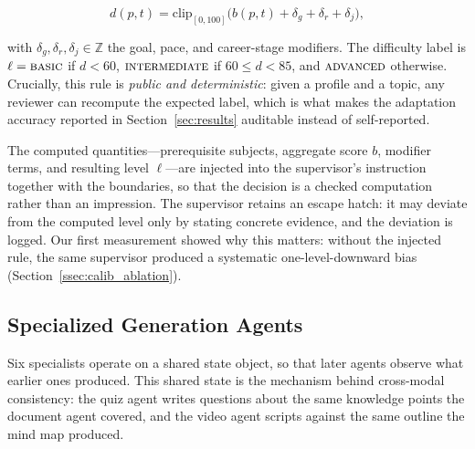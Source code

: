 \begin{equation}
d(p,t) = \mathrm{clip}_{[0,100]}\bigl(b(p,t) + \delta_g + \delta_r + \delta_j\bigr),
\end{equation}

with $\delta_g, \delta_r, \delta_j \in \mathbb{Z}$ the goal, pace, and
career-stage modifiers. The difficulty label is
$\ell = \textsc{basic}$ if $d < 60$, $\textsc{intermediate}$ if $60 \le d < 85$,
and $\textsc{advanced}$ otherwise. Crucially, this rule is \emph{public and
deterministic}: given a profile and a topic, any reviewer can recompute the
expected label, which is what makes the adaptation accuracy reported in
Section~\ref{sec:results} auditable instead of self-reported.

The computed quantities---prerequisite subjects, aggregate score $b$, modifier
terms, and resulting level $\ell$---are injected into the supervisor's
instruction together with the boundaries, so that the decision is a checked
computation rather than an impression. The supervisor retains an escape hatch:
it may deviate from the computed level only by stating concrete evidence, and
the deviation is logged. Our first measurement showed why this matters: without
the injected rule, the same supervisor produced a systematic one-level-downward
bias (Section~\ref{ssec:calib_ablation}).

\subsection{Specialized Generation Agents}

Six specialists operate on a shared state object, so that later agents observe
what earlier ones produced. This shared state is the mechanism behind
cross-modal consistency: the quiz agent writes questions about the same
knowledge points the document agent covered, and the video agent scripts
against the same outline the mind map produced.

